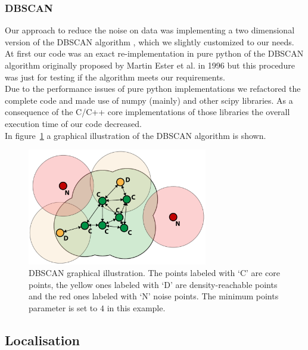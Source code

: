 \documentclass[lnicst,a4paper]{svmultln}
\begin{document}
\subsubsection{DBSCAN} Our approach to reduce the noise on data was implementing a two dimensional
version of the DBSCAN algorithm \cite{ester:kriegel}, which we slightly customized to our needs.
\\
At first our code was an exact re-implementation in pure python of the DBSCAN algorithm \cite{ester:kriegel}
originally proposed by Martin Ester et al. in 1996 but this procedure was just for testing if the algorithm
meets our requirements.
\\
Due to the performance issues of pure python implementations we refactored the complete code and made use
of numpy (mainly) and other scipy libraries. As a consequence of the C/C++ core implementations of those
libraries the overall execution time of our code decreased.
\\
In figure~\ref{fig:dbscan1} a graphical illustration of the DBSCAN algorithm
is shown.
\\
\begin{figure}
 	\centerline{\includegraphics[width=0.7\textwidth]{dbscan1.pdf}}
	{\caption{DBSCAN graphical illustration.
	The points labeled with `C' are core points,
	the yellow ones labeled with `D' are density-reachable points
	and the red ones labeled with `N' noise points.
	The minimum points parameter is set to $4$ in this example.}\label{fig:dbscan1}}
\end{figure}





\subsection{Localisation}
\end{document}
